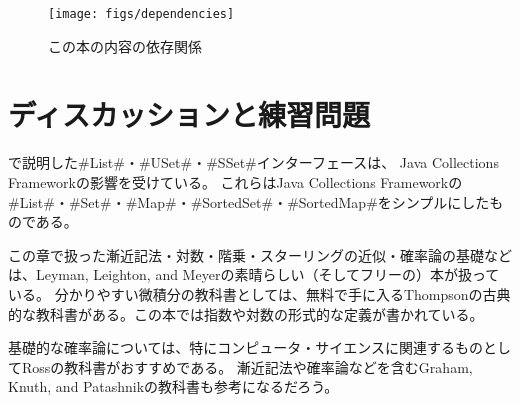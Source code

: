 \begin{figure}
  \begin{center}
    \texttt{[image: figs/dependencies]}
  \end{center}
  \caption{この本の内容の依存関係}
\end{figure}

\section{ディスカッションと練習問題}

で説明した#List#・#USet#・#SSet#インターフェースは、 Java Collections Framework\cite{oracle_collections}の影響を受けている。
%
これらはJava Collections Frameworkの#List#・#Set#・#Map#・#SortedSet#・#SortedMap#をシンプルにしたものである。

この章で扱った漸近記法・対数・階乗・スターリングの近似・確率論の基礎などは、Leyman, Leighton, and Meyer\cite{llm11}の素晴らしい（そしてフリーの）本が扱っている。
分かりやすい微積分の教科書としては、無料で手に入るThompson\cite{t14}の古典的な教科書がある。この本では指数や対数の形式的な定義が書かれている。

基礎的な確率論については、特にコンピュータ・サイエンスに関連するものとしてRoss\cite{r01}の教科書がおすすめである。
漸近記法や確率論などを含むGraham, Knuth, and Patashnik\cite{gkp94}の教科書も参考になるだろう。


